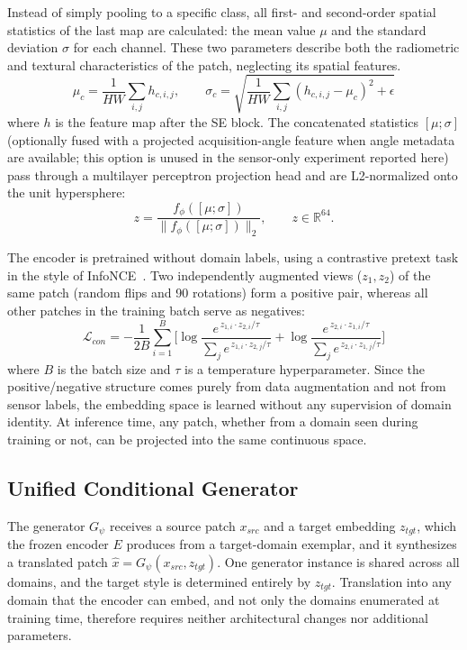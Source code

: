 \documentclass[runningheads]{llncs}
\begin{document}
Instead of simply pooling to a specific class, all first- and second-order spatial statistics of the last map are calculated: the mean value $\mu$ and the standard deviation $\sigma$ for each channel. These two parameters describe both the radiometric and textural characteristics of the patch, neglecting its spatial features.
\begin{equation}
\mu_c = \frac{1}{HW}\sum_{i,j} h_{c,i,j}, \qquad
\sigma_c = \sqrt{\frac{1}{HW}\sum_{i,j}(h_{c,i,j}-\mu_c)^2 + \epsilon}
\label{eq:stats}
\end{equation}
where $h$ is the feature map after the SE block. The concatenated statistics $[\mu;\sigma]$ (optionally fused with a projected acquisition-angle feature when angle metadata are available; this option is unused in the sensor-only experiment reported here) pass through a multilayer perceptron projection head and are L2-normalized onto the unit hypersphere:
\begin{equation}
z = \frac{f_\phi([\mu;\sigma])}{\lVert f_\phi([\mu;\sigma]) \rVert_2}, \qquad z \in \mathbb{R}^{64}.
\label{eq:embed}
\end{equation}

The encoder is pretrained without domain labels, using a contrastive pretext task in the style of InfoNCE~\cite{oord2018cpc}. Two independently augmented views ($z_1, z_2$) of the same patch (random flips and 90\textdegree{} rotations) form a positive pair, whereas all other patches in the training batch serve as negatives:
\begin{equation}
\mathcal{L}_{con} = -\frac{1}{2B}\sum_{i=1}^{B}\Big[
\log\frac{e^{\,z_{1,i}\cdot z_{2,i}/\tau}}{\sum_{j} e^{\,z_{1,i}\cdot z_{2,j}/\tau}}
+
\log\frac{e^{\,z_{2,i}\cdot z_{1,i}/\tau}}{\sum_{j} e^{\,z_{2,i}\cdot z_{1,j}/\tau}}
\Big]
\label{eq:infonce}
\end{equation}
where $B$ is the batch size and $\tau$ is a temperature hyperparameter. Since the positive/negative structure comes purely from data augmentation and not from sensor labels, the embedding space is learned without any supervision of domain identity. At inference time, any patch, whether from a domain seen during training or not, can be projected into the same continuous space.

\subsection{Unified Conditional Generator}
\label{sec:generator}
The generator $G_\psi$ receives a source patch $x_{src}$ and a target embedding $z_{tgt}$, which the frozen encoder $E$ produces from a target-domain exemplar, and it synthesizes a translated patch $\hat{x} = G_\psi(x_{src}, z_{tgt})$. One generator instance is shared across all domains, and the target style is determined entirely by $z_{tgt}$. Translation into any domain that the encoder can embed, and not only the domains enumerated at training time, therefore requires neither architectural changes nor additional parameters.
\end{document}
